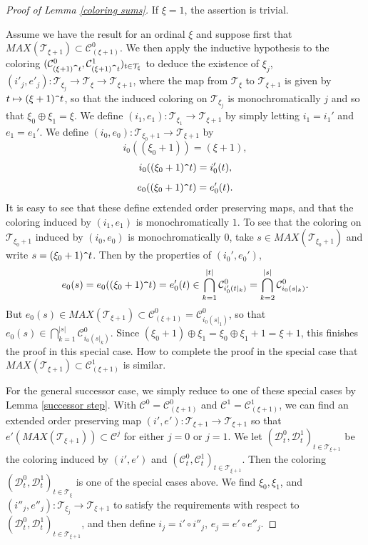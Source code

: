 \documentclass[12pt]{amsart}
\theoremstyle{definition}
\newcommand{\ddd}{\mathcal{D}}
\newcommand{\ccc}{\mathcal{C}}
\newcommand{\ttt}{\mathcal{T}}
\begin{document}
\begin{proof}[Proof of Lemma \ref{coloring sums}] If $\xi=1$, the assertion is trivial.  

Assume we have the result for an ordinal $\xi$ and suppose first that $MAX(\ttt_{\xi+1})\subset \mathcal{C}^0_{(\xi+1)}$.  We then apply the inductive hypothesis to the coloring $(\ccc^0_{(\xi+1)\verb!^!t}, \ccc^1_{(\xi+1)\verb!^!t})_{t\in \ttt_\xi}$ to deduce the existence of $\xi_j$, $(i'_j, e'_j):\ttt_{\xi_j}\to \ttt_\xi\to \ttt_{\xi+1}$, where the map from $\ttt_\xi$ to $\ttt_{\xi+1}$ is given by $t\mapsto (\xi+1)\verb!^!t$, so that the induced coloring on $\ttt_{\xi_j}$ is monochromatically $j$ and so that $\xi_0\oplus \xi_1= \xi$.  We define $(i_1, e_1):\ttt_{\xi_1}\to \ttt_{\xi+1}$ by simply letting $i_1=i_1'$ and $e_1=e_1'$.  We define $(i_0, e_0):\ttt_{\xi_0+1}\to \ttt_{\xi+1}$ by $$i_0((\xi_0+1))=(\xi+1),$$ $$i_0((\xi_0+1)\verb!^!t)= i_0'(t),$$ $$ e_0((\xi_0+1)\verb!^!t)=e_0'(t).$$  It is easy to see that these define extended order preserving maps, and that the coloring induced by $(i_1, e_1)$ is monochromatically $1$.  To see that the coloring on $\ttt_{\xi_0+1}$ induced by $(i_0, e_0)$ is monochromatically $0$, take $s\in MAX(\ttt_{\xi_0+1})$ and write $s= (\xi_0+1)\verb!^!t$.  Then by the properties of $(i_0', e_0')$, $$e_0(s)=e_0((\xi_0+1)\verb!^!t)=e_0'(t)\in \bigcap_{k=1}^{|t|} \ccc^0_{i_0'(t|_k)}=\bigcap_{k=2}^{|s|} \ccc^0_{i_0(s|_k)}.$$  But $e_0(s)\in MAX(\ttt_{\xi+1})\subset \ccc^0_{(\xi+1)}= \ccc^0_{i_0(s|_1)}$, so that $e_0(s)\in \bigcap_{k=1}^{|s|} \ccc^0_{i_0(s|_k)}$.  Since $(\xi_0+1)\oplus \xi_1=\xi_0\oplus \xi_1+1= \xi+1$, this finishes the proof in this special case.  How to complete the proof in the special case that $MAX(\ttt_{\xi+1})\subset \ccc^1_{(\xi+1)}$ is similar.  

For the general successor case, we simply reduce to one of these special cases by Lemma \ref{successor step}. With $\ccc^0= \ccc^0_{(\xi+1)}$ and $\ccc^1=\ccc_{(\xi+1)}^1$, we can find an extended order preserving map $(i', e'):\ttt_{\xi+1}\to \ttt_{\xi+1}$ so that $e'(MAX(\ttt_{\xi+1}))\subset \ccc^j$ for either $j=0$ or $j=1$.  We let $(\ddd^0_t, \ddd^1_t)_{t\in \ttt_{\xi+1}}$ be the coloring induced by $(i',e')$ and $(\ccc^0_t, \ccc^1_t)_{t\in \ttt_{\xi+1}}$.  Then the coloring $(\ddd^0_t, \ddd^1_t)_{t\in \ttt_\xi}$ is one of the special cases above.  We find $\xi_0, \xi_1$, and $(i''_j, e''_j):\ttt_{\xi_j}\to \ttt_{\xi+1}$ to satisfy the requirements with respect to $(\ddd^0_t, \ddd^1_t)_{t\in \ttt_{\xi+1}}$, and then define $i_j= i'\circ i''_j$, $e_j=e'\circ e''_j$.  



\end{proof}
\end{document}
